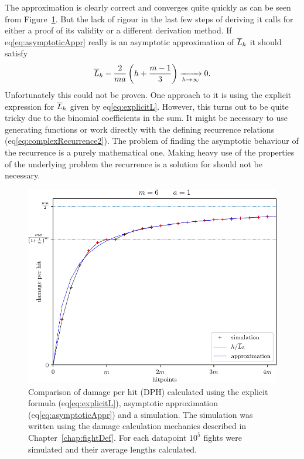 The approximation is clearly correct and converges quite quickly as can be seen from Figure~\ref{fig:apprComparison}. But the lack of rigour in the last few steps of deriving it calls for either a proof of its validity or a different derivation method. If eq\ref{eq:asymptoticAppr} really is an asymptotic approximation of $\overline{L}_h$ it should satisfy
\begin{align}
    \overline{L}_h - \frac{2}{ma}\left(h + \frac{m-1}{3}\right) \xrightarrow[h \rightarrow \infty]{} 0.
\end{align}
Unfortunately this could not be proven. One approach to it is using the explicit expression for $\overline{L}_h$ given by eq\ref{eq:explicitL}. However, this turns out to be quite tricky due to the binomial coefficients in the sum. It might be necessary to use generating functions or work directly with the defining recurrence relations (eq\ref{eq:complexRecurrence2}). The problem of finding the asymptotic behaviour of the recurrence is a purely mathematical one. Making heavy use of the properties of the underlying problem the recurrence is a solution for should not be necessary.
\begin{figure}[t]\label{fig:apprComparison}
    \includegraphics[scale=1.1]{dph-appr-m6.pdf}
    \caption{Comparison of damage per hit (DPH) calculated using the explicit formula (eq\ref{eq:explicitL}), asymptotic approximation (eq\ref{eq:asymptoticAppr}) and a simulation. The simulation was written using the damage calculation mechanics described in Chapter~\ref{chap:fightDef}. For each datapoint $10^{5}$ fights were simulated and their average lengths calculated.}
\end{figure}

